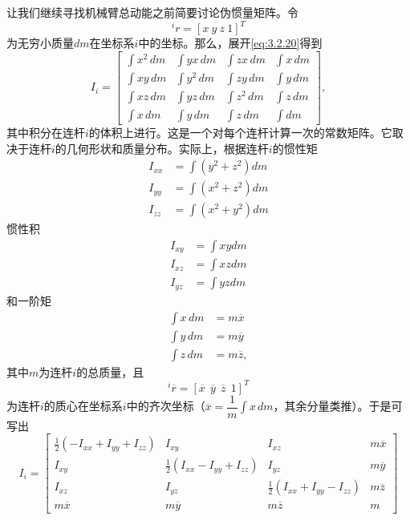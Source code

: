 \documentclass[12pt,a4paper]{ctexart}
\begin{document}
让我们继续寻找机械臂总动能之前简要讨论伪惯量矩阵。令
\begin{equation}
{^ir} = [x \ y \ z \ 1]^T
\end{equation}
为无穷小质量$dm$在坐标系$i$中的坐标。那么，展开\eqref{eq:3.2.20}得到
\begin{equation}\label{eq:3.2.22}
I_i = \begin{bmatrix}
\displaystyle\int x^2\,dm & \displaystyle\int yx\,dm & \displaystyle\int zx\,dm & \displaystyle\int x\,dm \\[6pt]
\displaystyle\int xy\,dm & \displaystyle\int y^2\,dm & \displaystyle\int zy\,dm & \displaystyle\int y\,dm \\[6pt]
\displaystyle\int xz\,dm & \displaystyle\int yz\,dm & \displaystyle\int z^2\,dm & \displaystyle\int z\,dm \\[6pt]
\displaystyle\int x\,dm & \displaystyle\int y\,dm & \displaystyle\int z\,dm & \displaystyle\int dm
\end{bmatrix},
\end{equation}
其中积分在连杆$i$的体积上进行。这是一个对每个连杆计算一次的常数矩阵。它取决于连杆$i$的几何形状和质量分布。实际上，根据连杆$i$的惯性矩
\begin{align}
I_{xx} &= \int(y^2+z^2)dm \\ I_{yy} &= \int(x^2+z^2)dm \\ I_{zz} &= \int(x^2+y^2)dm
\end{align}
惯性积
\begin{align}
I_{xy} &= \int xy dm \\ I_{xz} &= \int xz dm \\ I_{yz} &= \int yz dm
\end{align}
和一阶矩
\begin{align}
\int x\,dm &= m\overline{x} \\
\int y\,dm &= m\overline{y} \\
\int z\,dm &= m\overline{z},
\end{align}
其中$m$为连杆$i$的总质量，且
\begin{equation}\label{eq:3.2.26}
{^i\overline{r}} = [\overline{x}\ \ \overline{y}\ \ \overline{z}\ \ 1]^T
\end{equation}
为连杆$i$的质心在坐标系$i$中的齐次坐标（$\overline{x}=\dfrac{1}{m}\displaystyle\int x\,dm$，其余分量类推）。于是可写出
\begin{equation}
I_i = \begin{bmatrix} \frac{1}{2}(-I_{xx}+I_{yy}+I_{zz}) & I_{xy} & I_{xz} & m\overline{x} \\ I_{xy} & \frac{1}{2}(I_{xx}-I_{yy}+I_{zz}) & I_{yz} & m\overline{y} \\ I_{xz} & I_{yz} & \frac{1}{2}(I_{xx}+I_{yy}-I_{zz}) & m\overline{z} \\ m\overline{x} & m\overline{y} & m\overline{z} & m \end{bmatrix}
\end{equation}
\end{document}
